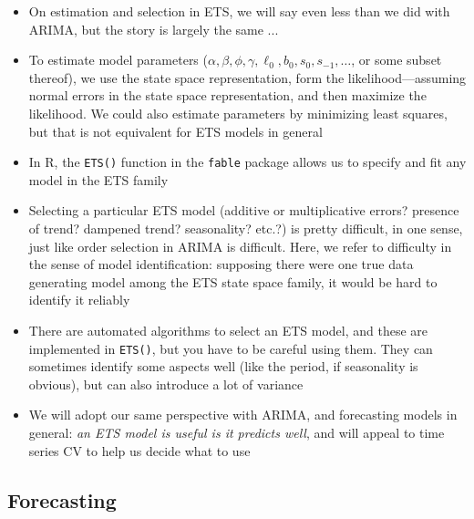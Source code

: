 \documentclass{article}
\begin{document}
\begin{itemize}
\item On estimation and selection in ETS, we will say even less than we did with
  ARIMA, but the story is largely the same ...

\item To estimate model parameters
  ($\alpha,\beta,\phi,\gamma,\ell_0,b_0,s_0,s_{-1},\dots$, or some subset
  thereof), we use the state space representation, form the
  likelihood---assuming normal errors in the state space representation, and
  then maximize the likelihood. We could also estimate parameters by minimizing
  least squares, but that is not equivalent for ETS models in general 

\item In R, the \verb|ETS()| function in the \verb|fable| package allows us to
  specify and fit any model in the ETS family

\item Selecting a particular ETS model (additive or multiplicative errors?
  presence of trend? dampened trend? seasonality? etc.?) is pretty difficult, in
  one sense, just like order selection in ARIMA is difficult. Here, we refer to
  difficulty in the sense of model identification: supposing there were one true
  data generating model among the ETS state space family, it would be hard to
  identify it reliably 

\item There are automated algorithms to select an ETS model, and these are
  implemented in \verb|ETS()|, but you have to be careful using them. They can
  sometimes identify some aspects well (like the period, if seasonality is
  obvious), but can also introduce a lot of variance 

\item We will adopt our same perspective with ARIMA, and forecasting models in
  general: \emph{an ETS model is useful is it predicts well}, and will appeal to
  time series CV to help us decide what to use 
\end{itemize}

\subsection{Forecasting}
\end{document}
